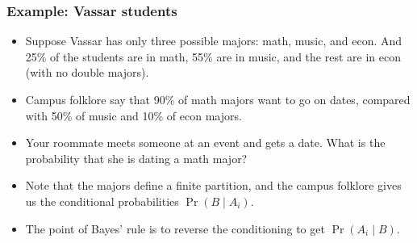 \documentclass[slidestop,compress,mathserif]{beamer}
\begin{document}
\begin{frame}\frametitle{Example: Vassar students}
\begin{itemize}
\item Suppose Vassar has only three possible majors:  math, music,
and econ. And 25\% of the students are in math,
55\% are in music, and the rest are in econ (with no double majors).
\pause
\item Campus folklore say that 90\% of math majors want to go on dates,
compared with 50\% of music and 10\% of econ majors.
\pause
\item Your roommate meets someone at an event and gets a date.
What is the probability that she is dating a math major?
\pause
\item Note that the majors define a finite partition, and the campus
folklore gives us the conditional probabilities $\Pr(B \mid A_i)$.
\pause
\item The point of Bayes' rule is to reverse the conditioning to get
$\Pr(A_i \mid B)$.
\end{itemize}




\end{frame}
\end{document}
